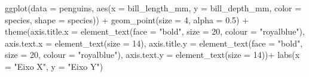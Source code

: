 \documentclass[
]{book}
\newenvironment{Shaded}{\begin{snugshade}}{\end{snugshade}}
\newcommand{\AttributeTok}[1]{\textcolor[rgb]{0.61,0.61,0.61}{#1}}
\newcommand{\DecValTok}[1]{\textcolor[rgb]{0.06,0.06,0.06}{#1}}
\newcommand{\FloatTok}[1]{\textcolor[rgb]{0.06,0.06,0.06}{#1}}
\newcommand{\FunctionTok}[1]{\textcolor[rgb]{0,0,0}{#1}}
\newcommand{\NormalTok}[1]{#1}
\newcommand{\SpecialCharTok}[1]{\textcolor[rgb]{0,0,0}{#1}}
\newcommand{\StringTok}[1]{\textcolor[rgb]{0.5,0.5,0.5}{#1}}
\begin{document}
\begin{Shaded}
\begin{Highlighting}[]
\FunctionTok{ggplot}\NormalTok{(}\AttributeTok{data =}\NormalTok{ penguins, }
       \FunctionTok{aes}\NormalTok{(}\AttributeTok{x =}\NormalTok{ bill\_length\_mm, }
           \AttributeTok{y =}\NormalTok{ bill\_depth\_mm,}
           \AttributeTok{color =}\NormalTok{ species,}
           \AttributeTok{shape =}\NormalTok{ species)) }\SpecialCharTok{+}
  \FunctionTok{geom\_point}\NormalTok{(}\AttributeTok{size =} \DecValTok{4}\NormalTok{, }\AttributeTok{alpha =} \FloatTok{0.5}\NormalTok{) }\SpecialCharTok{+}
  \FunctionTok{theme}\NormalTok{(}\AttributeTok{axis.title.x =} \FunctionTok{element\_text}\NormalTok{(}\AttributeTok{face =} \StringTok{"bold"}\NormalTok{, }\AttributeTok{size =} \DecValTok{20}\NormalTok{, }\AttributeTok{colour =} \StringTok{"royalblue"}\NormalTok{),}
        \AttributeTok{axis.text.x =} \FunctionTok{element\_text}\NormalTok{(}\AttributeTok{size =} \DecValTok{14}\NormalTok{),}
        \AttributeTok{axis.title.y =} \FunctionTok{element\_text}\NormalTok{(}\AttributeTok{face =} \StringTok{"bold"}\NormalTok{, }\AttributeTok{size =} \DecValTok{20}\NormalTok{, }\AttributeTok{colour =} \StringTok{"royalblue"}\NormalTok{),}
        \AttributeTok{axis.text.y =} \FunctionTok{element\_text}\NormalTok{(}\AttributeTok{size =} \DecValTok{14}\NormalTok{))}\SpecialCharTok{+}
  \FunctionTok{labs}\NormalTok{(}\AttributeTok{x =} \StringTok{"Eixo X"}\NormalTok{, }\AttributeTok{y =} \StringTok{"Eixo Y"}\NormalTok{)}




\end{Highlighting}
\end{Shaded}
\end{document}
